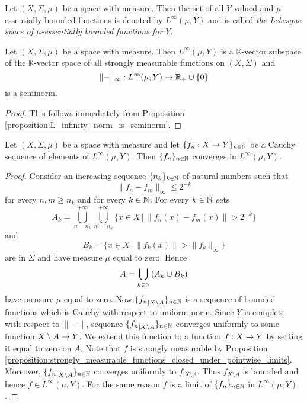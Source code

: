 \begin{definition}
    Let $(X,\Sigma,\mu)$ be a space with measure. Then the set of all $Y$-valued and $\mu$-essentially bounded functions is denoted by $L^{\infty}(\mu,Y)$ and is called \textit{the Lebesgue space of $\mu$-essentially bounded functions for $Y$}.
\end{definition}

\begin{corollary}\label{corollary:L_infinity_is_seminormed_topological_vector_space}
    Let $(X,\Sigma,\mu)$ be a space with measure. Then $L^{\infty}(\mu,Y)$ is a $\mathbb{K}$-vector subspace of the $\mathbb{K}$-vector space of all strongly measurable functions on $(X,\Sigma)$ and
    $$\lVert -\rVert_{\infty}:L^{\infty}(\mu,Y)\rightarrow {\mathbb R}_+\cup \{0\}$$
    is a seminorm.
\end{corollary}
\begin{proof}
    This follows immediately from Proposition \ref{proposition:L_infinity_norm_is_seminorm}.
\end{proof}

\begin{theorem}[Riesz]\label{theorem:Riesz_theorem_for_L_infinity}
    Let $(X,\Sigma,\mu)$ be a space with measure and let $\{f_n:X\rightarrow Y\}_{n\in {\mathbb N}}$ be a Cauchy sequence of elements of $L^{\infty}(\mu,Y)$. Then $\{f_n\}_{n\in {\mathbb N}}$ converges in $L^{\infty}(\mu,Y)$.
\end{theorem}
\begin{proof}
    Consider an increasing sequence $\{n_k\}_{k\in {\mathbb N}}$ of natural numbers such that
    $$\lVert f_{n} - f_{m}\rVert_{\infty} \leq 2^{-k}$$
    for every $n,m\geq n_k$ and for every $k \in {\mathbb N}$. For every $k\in {\mathbb N}$ sets
    $$A_{k} = \bigcup_{n=n_k}^{+\infty}\bigcup_{m=n_k}^{+\infty}\big\{x\in X\,\big|\,\lVert f_{n}(x) - f_{m}(x) \rVert > 2^{-k} \big\}$$
    and
    $$B_k = \big\{x\in X\,\big|\,\lVert f_k(x) \rVert > \lVert f_k \rVert_{\infty}\big\}$$
    are in $\Sigma$ and have measure $\mu$ equal to zero. Hence
    $$A = \bigcup_{k\in {\mathbb N}}\left(A_k\cup B_k\right)$$
    have measure $\mu$ equal to zero. Now $\{{f_n}_{\mid X\setminus A}\}_{n\in {\mathbb N}}$ is a sequence of bounded functions which is Cauchy with respect to uniform norm. Since $Y$ is complete with respect to $\lVert-\rVert$, sequence $\{{f_n}_{\mid X\setminus A}\}_{n\in {\mathbb N}}$ converges uniformly to some function $X\setminus A\rightarrow Y$. We extend this function to a function $f:X\rightarrow Y$ by setting it equal to zero on $A$. Note that $f$ is strongly measurable by Proposition \ref{proposition:strongly_measurable_functions_closed_under_pointwise_limits}. Moreover, $\{{f_n}_{\mid X\setminus A}\}_{n\in {\mathbb N}}$ converges uniformly to $f_{\mid X\setminus A}$. Thus $f_{X\setminus A}$ is bounded and hence $f\in L^{\infty}(\mu,Y)$. For the same reason $f$ is a limit of $\{f_n\}_{n\in {\mathbb N}}$ in $L^{\infty}(\mu,Y)$.
\end{proof}













\small



